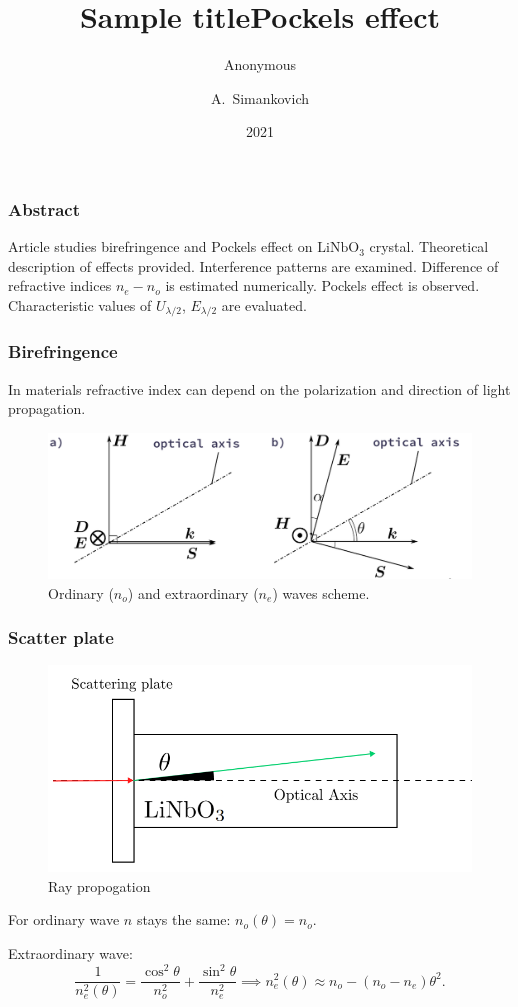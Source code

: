 \documentclass{beamer}
\title{Sample title}
\author{Anonymous}
\institute{Overleaf}
\date{2021}
\title[About Beamer] %
{Pockels effect}
\author[Arthur, Doe] %
{A.~Simankovich }
\institute[VFU] %
{
	Moscow Institute of Physics and Technology
}
\date[VLC 2023] %
\begin{document}
	
	\frame{\titlepage}
	
	\begin{frame}
		\frametitle{Abstract}
		
		Article studies birefringence and Pockels effect on $\text{LiNbO}_3$ crystal. Theoretical description of effects provided. Interference patterns are examined. Difference of refractive indices $n_e - n_o$ is estimated numerically. Pockels effect is observed. Characteristic values of $U_{\lambda/2}$, $E_{\lambda/2}$ are evaluated.
	\end{frame}
	
	\begin{frame}
		\frametitle{Birefringence}
		In materials refractive index can depend on the polarization and direction of light propagation.
		\begin{figure}
			\footnotesize
			\centering
			\includegraphics[width=\linewidth]{res/birefringence}
			\vspace{-5pt}
			\footnotesize
			\caption{\footnotesize Ordinary ($n_o$) and extraordinary ($n_e$) waves scheme.}
		\end{figure}		
	\end{frame}


	\begin{frame}
		\frametitle{Scatter plate}		
		\begin{figure}
			\footnotesize
			\centering
			\includegraphics[width=0.9\linewidth]{res/theta_propagation}
			\vspace{-5pt}
			\footnotesize
			\caption{\footnotesize Ray propogation}
		\end{figure}
		
		For ordinary wave $n$ stays the same: $n_o(\theta) = n_o$.
		
		Extraordinary wave:
		\footnotesize
		$$\frac{1}{n_e^2(\theta)} = \frac{\cos^2{\theta}}{n_o^2} + \frac{\sin^2{\theta}}{n_e^2} \implies n_e^2(\theta) \approx n_o - (n_o - n_e) \theta^2.$$
		
	\end{frame}	
			
\end{document}

